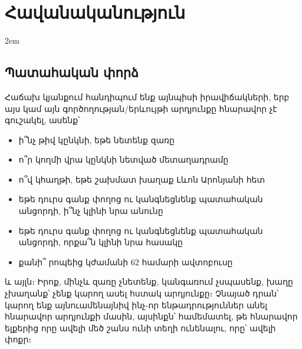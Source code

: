\setchapterpreamble[u]{\margintoc}
\chapter{Հավանականություն}

\emergencystretch 2em

\section{Պատահական փորձ}

Հաճախ կյանքում հանդիպում ենք այնպիսի իրավիճակների, երբ այս կամ այն գործողության/երևույթի արդյունքը հնարավոր չէ գուշակել, ասենք՝
\begin{itemize}
    \item ի՞նչ թիվ կընկնի, եթե նետենք զառը
    \item ո՞ր կողմի վրա կընկնի նետված մետաղադրամը
    \item ո՞վ կհաղթի, եթե շախմատ խաղաք Լևոն Արոնյանի հետ
    \item եթե դուրս գանք փողոց ու կանգնեցնենք պատահական անցորդի, ի՞նչ կլինի նրա անունը
    \item եթե դուրս գանք փողոց ու կանգնեցնենք պատահական անցորդի, որքա՞ն կլինի նրա հասակը
    \item քանի՞ րոպեից կժամանի $62$ համարի ավտոբուսը
\end{itemize}
և այլն։ Իրոք, մինչև զառը չնետենք, կանգառում չսպասենք, խաղը չխաղանք՝ չենք կարող ասել հստակ արդյունքը։ 
Չնայած դրան՝ կարող ենք այնուամենայնիվ ինչ-որ ենթադրություններ անել հնարավոր արդյունքի մասին, այսինքն՝ համեմատել, թե հնարավոր ելքերից որը ավելի մեծ շանս ունի  տեղի ունենալու, որը՝ ավելի փոքր։ 

